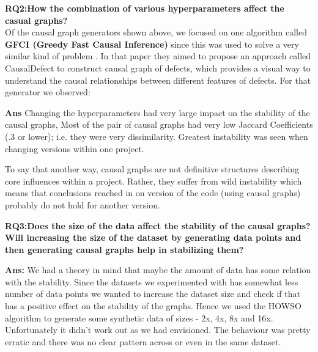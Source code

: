 \documentclass[sigconf,review,anonymous,nonacm=true]{acmart}
\begin{document}
\textbf{RQ2:How the combination of various hyperparameters affect the casual graphs?}\\

Of the causal graph generators shown above, we focused
on one algorithm called \textbf{GFCI (Greedy Fast Causal Inference)} since this was used to solve a very similar kind of problem \cite{r14}. In that paper they aimed to propose an approach called CausalDefect to construct causal graph of defects, which provides a visual way to understand the causal
relationships between different features of defects. For that generator we observed:

\vspace{2mm}
 \begin{mdframed}[backgroundcolor=gray!15,linewidth=3px,%
    rightline=false,%
    topline=false,%
    bottomline=false,] 
\textbf{Ans}
Changing the hyperparameters had very large impact on the stability of the causal graphs, Most of the pair of causal graphs had very low Jaccard Coefficients (.3 or lower); i.e. they were very   dissimilarity.  Greatest instability was seen when changing
versions within one project.
\end{mdframed}
\vspace{2mm}

To say that another way, causal graphs are not definitive structures
describing core influences within a project. Rather, they suffer
from wild instability which means that conclusions reached in on version of the code (using causal graphs) probably do not hold for another version.

\textbf{RQ3:Does the size of the data affect the stability of the causal graphs? Will increasing the size of the dataset by generating data points and then generating causal graphs help in stabilizing them?}\\
\vspace{2mm}
 \begin{mdframed}[backgroundcolor=gray!15,linewidth=3px,%
    rightline=false,%
    topline=false,%
    bottomline=false,] 
\textbf{Ans:}
We had a theory in mind that maybe the amount of data has some relation with the stability. Since the datasets we experimented with has somewhat less number of data points we wanted to increase the dataset size and check if that has a positive effect on the stability of the graphs. Hence we used the HOWSO algorithm to generate some synthetic data of sizes - 2x, 4x, 8x and 16x. Unfortunately it didn't work out as we had envisioned. The behaviour was pretty erratic and there was no clear pattern across or even in the same dataset. 
\end{mdframed}
\vspace{2mm}
\end{document}
